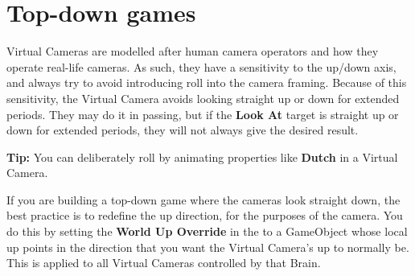 \chapter{Top-\/down games}
\hypertarget{md__hey_tea_9_2_library_2_package_cache_2com_8unity_8cinemachine_0d2_89_87_2_documentation_0i_2_cinemachine_top_down}{}\label{md__hey_tea_9_2_library_2_package_cache_2com_8unity_8cinemachine_0d2_89_87_2_documentation_0i_2_cinemachine_top_down}
\label{md__hey_tea_9_2_library_2_package_cache_2com_8unity_8cinemachine_0d2_89_87_2_documentation_0i_2_cinemachine_top_down_autotoc_md726}%
%
  Virtual Cameras are modelled after human camera operators and how they operate real-\/life cameras. As such, they have a sensitivity to the up/down axis, and always try to avoid introducing roll into the camera framing. Because of this sensitivity, the Virtual Camera avoids looking straight up or down for extended periods. They may do it in passing, but if the {\bfseries{Look At}} target is straight up or down for extended periods, they will not always give the desired result.

{\bfseries{Tip\+:}} You can deliberately roll by animating properties like {\bfseries{Dutch}} in a Virtual Camera.

If you are building a top-\/down game where the cameras look straight down, the best practice is to redefine the up direction, for the purposes of the camera. You do this by setting the {\bfseries{World Up Override}} in the  to a Game\+Object whose local up points in the direction that you want the Virtual Camera’s up to normally be. This is applied to all Virtual Cameras controlled by that  Brain. 